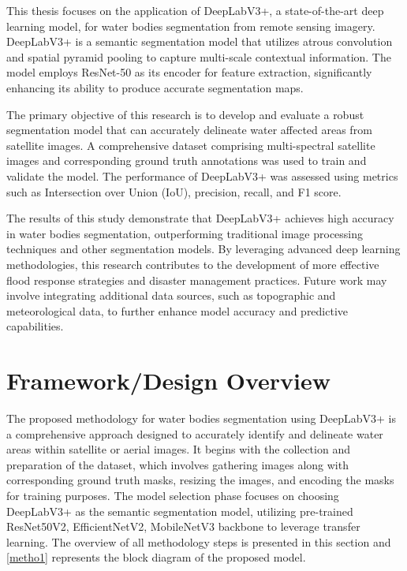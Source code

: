 This thesis focuses on the application of DeepLabV3+, a state-of-the-art deep learning model, for water bodies segmentation from remote sensing imagery. DeepLabV3+ is a semantic segmentation model that utilizes atrous convolution and spatial pyramid pooling to capture multi-scale contextual information. The model employs ResNet-50 as its encoder for feature extraction, significantly enhancing its ability to produce accurate segmentation maps.\cite{intro4}

The primary objective of this research is to develop and evaluate a robust segmentation model that can accurately delineate water affected areas from satellite images. A comprehensive dataset comprising multi-spectral satellite images and corresponding ground truth annotations was used to train and validate the model. The performance of DeepLabV3+ was assessed using metrics such as Intersection over Union (IoU), precision, recall, and F1 score.

The results of this study demonstrate that DeepLabV3+ achieves high accuracy in water bodies segmentation, outperforming traditional image processing techniques and other segmentation models. By leveraging advanced deep learning methodologies, this research contributes to the development of more effective flood response strategies and disaster management practices. Future work may involve integrating additional data sources, such as topographic and meteorological data, to further enhance model accuracy and predictive capabilities.

\section{Framework/Design Overview}
The proposed methodology for water bodies segmentation using DeepLabV3+ is a comprehensive approach designed to accurately identify and delineate water areas within satellite or aerial images. It begins with the collection and preparation of the dataset, which involves gathering images along with corresponding ground truth masks, resizing the images, and encoding the masks for training purposes. The model selection phase focuses on choosing DeepLabV3+ as the semantic segmentation model, utilizing pre-trained ResNet50V2, EfficientNetV2, MobileNetV3 backbone to leverage transfer learning. The overview of all methodology steps is presented in this section and \ref{metho1} represents the block diagram of the proposed model.
\\

